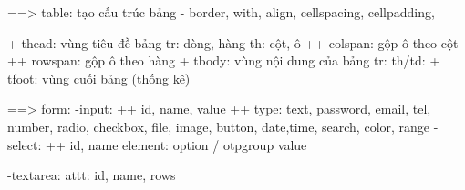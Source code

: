 ==> table: tạo cấu trúc bảng
    - border, with, align, cellspacing, cellpadding,


    + thead: vùng tiêu đề bảng
        tr: dòng, hàng
            th: cột, ô
                ++ colspan: gộp ô theo cột
                ++ rowspan: gộp ô theo hàng
        + tbody: vùng nội dung của bảng 
            tr: 
                th/td:     
        + tfoot: vùng cuối bảng (thống kê)
       
==> form:
    -input:
        ++ id, name, value
        ++ type:
            text, password, email, tel, number, radio, checkbox, file, image, button, date,time, search, color, range
    -select:
        ++ id, name
            element: option / otpgroup
                value

    -textarea: 
        attt: id, name, rows
